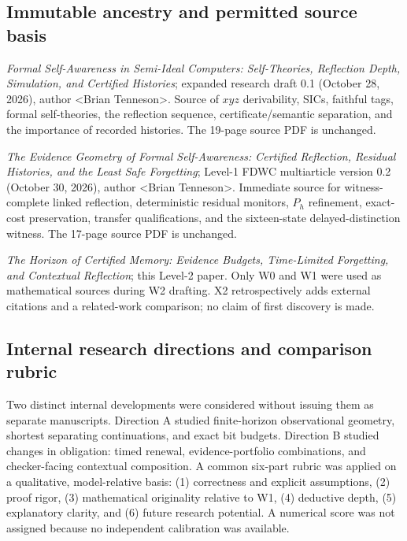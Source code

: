 \documentclass[11pt,letterpaper]{article}
\newcommand{\authorname}{\textless Brian Tenneson\textgreater}
\begin{document}
\subsection*{Immutable ancestry and permitted source basis}
\begin{description}[leftmargin=2.2cm,style=nextline]
\item[W0] \emph{Formal Self-Awareness in Semi-Ideal Computers: Self-Theories, Reflection Depth, Simulation, and Certified Histories}; expanded research draft 0.1 (October 28, 2026), author \authorname. Source of $xyz$ derivability, SICs, faithful tags, formal self-theories, the reflection sequence, certificate/semantic separation, and the importance of recorded histories. The 19-page source PDF is unchanged.
\item[W1] \emph{The Evidence Geometry of Formal Self-Awareness: Certified Reflection, Residual Histories, and the Least Safe Forgetting}; Level-1 FDWC multiarticle version 0.2 (October 30, 2026), author \authorname. Immediate source for witness-complete linked reflection, deterministic residual monitors, $P_h$ refinement, exact-cost preservation, transfer qualifications, and the sixteen-state delayed-distinction witness. The 17-page source PDF is unchanged.
\item[W2] \emph{The Horizon of Certified Memory: Evidence Budgets, Time-Limited Forgetting, and Contextual Reflection}; this Level-2 paper. Only W0 and W1 were used as mathematical sources during W2 drafting. X2 retrospectively adds external citations and a related-work comparison; no claim of first discovery is made.
\end{description}

\subsection*{Internal research directions and comparison rubric}
Two distinct internal developments were considered without issuing them as separate manuscripts. Direction A studied finite-horizon observational geometry, shortest separating continuations, and exact bit budgets. Direction B studied changes in obligation: timed renewal, evidence-portfolio combinations, and checker-facing contextual composition. A common six-part rubric was applied on a qualitative, model-relative basis: (1) correctness and explicit assumptions, (2) proof rigor, (3) mathematical originality relative to W1, (4) deductive depth, (5) explanatory clarity, and (6) future research potential. A numerical score was not assigned because no independent calibration was available.
\end{document}
